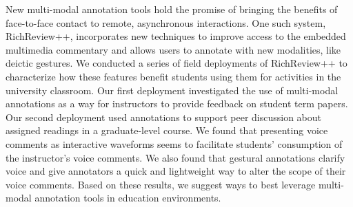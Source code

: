 \documentclass{article}
\begin{document}
\cite{Yoon2016-nk}
New multi-modal annotation tools hold the promise of bringing the benefits of face-to-face contact to remote, asynchronous interactions. One such system, RichReview++, incorporates new techniques to improve access to the embedded multimedia commentary and allows users to annotate with new modalities, like deictic gestures. We conducted a series of field deployments of RichReview++ to characterize how these features benefit students using them for activities in the university classroom. Our first deployment investigated the use of multi-modal annotations as a way for instructors to provide feedback on student term papers. Our second deployment used annotations to support peer discussion about assigned readings in a graduate-level course. We found that presenting voice comments as interactive waveforms seems to facilitate students' consumption of the instructor's voice comments. We also found that gestural annotations clarify voice and give annotators a quick and lightweight way to alter the scope of their voice comments. Based on these results, we suggest ways to best leverage multi-modal annotation tools in education environments.



\end{document}
